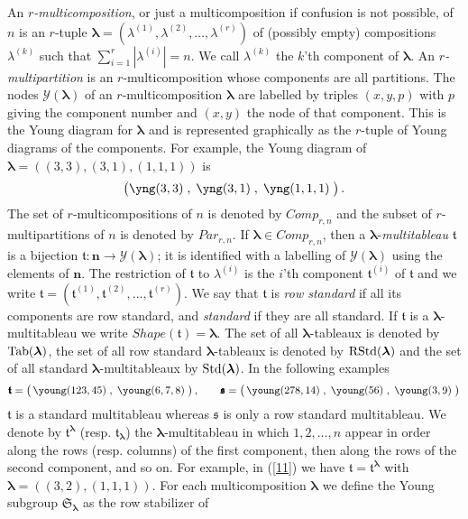\documentclass[10pt,a4,twoside,hidelinks,rm]{article}
\newcommand{\Y}{\mathcal{Y}}
\newcommand{\T}{\mathfrak{t}}
\newcommand{\bT}{\pmb{\mathfrak{t}}}
\newcommand{\Bs}{\pmb{\mathfrak{s}}}
\newcommand{\MP}{{ {Par}}_{r,n}}
\newcommand{\MC}{{ {Comp}}_{r,n}}
\newcommand{\Si}{\mathfrak{S}}
\newcommand{\std}{{\rm Std}}
\newcommand{\rstd}{{\rm RStd}}
\newcommand{\Tab}{{\rm Tab}}
\newcommand\blambda{{\boldsymbol\lambda}}
\theoremstyle{plain}
\begin{document}
An \textit{$r$-multicomposition}, or just a multicomposition if confusion is not possible, 
of $n$ is an $r$-tuple
$\blambda=(\lambda^{(1)},\lambda^{(2)},\ldots,\lambda^{(r)})$ of
(possibly empty) compositions $\lambda^{(k)}$ such that
$\sum_{i=1}^{r}|\lambda^{(i)}|=n$. We call $\lambda^{(k)}$ the
$k$'th component of $\blambda$. An \textit{$r$-multipartition} is 
an $r$-multicomposition whose
components are all partitions.
The nodes $ \Y(\blambda) $ of an $r$-multicomposition $ \blambda $ are labelled by triples
$(x,y,p)$ with $p$ giving the component number and $ (x,y) $
the node of that component.
This is the
Young diagram for $ \blambda $ and is represented
graphically as the $ r$-tuple of Young diagrams of the components. For example, the
Young diagram of $\blambda=((3,3),(3,1),(1,1,1))$ is
$$\left( \yng(3,3) \;,\; \yng(3,1) \;,\; \yng(1,1,1)\; \right).$$
The set of $r$-multicompositions of $n$ is denoted by $ \MC  $ 
and the subset of $r$-multi\-partitions of $n$ is denoted by $ \MP  $.
If $\blambda \in \MC$, then 
a $\blambda$-\textit{multitableau} $ \bT $ is a
bijection $\bT: \mathbf{n} \to \Y({\blambda})$; it is 
identified with a labelling of $ \Y(\blambda) $ using the elements of
$\mathbf{n}$. The restriction of $\bT$ to $ \lambda^{(i)} $ is 
the $i$'th component $ \T^{(i)} $ of $\bT$ and we write $
\bT=(\T^{(1)}, \T^{(2)}, \ldots, \T^{(r)}) $. We say that $\bT$ is \textit{row
standard} if all its components are row standard, and
\textit{standard} if they are all standard. If $
\bT $ is a $ \blambda$-multitableau we write $ Shape(\bT) =
\blambda$. The set of all
$\blambda$-tableaux is
denoted by $\Tab(\blambda)$, the set of all
row standard $\blambda$-tableaux is
denoted by $\rstd(\blambda)$
and the set of all 
standard $\blambda$-multitableaux 
by $\std(\blambda)$.
In the following examples
\begin{equation}\label{11}
\bT=\left(\,\young(123,45)\;,\;\young(6,7,8)\;\right), \qquad
\Bs=\left(\,\young(278,14)\;,\;\young(56)\;,\;\young(3,9)
\;\right)
\end{equation}
$\bT$ is a standard multitableau whereas $\Bs$ is only a row standard multitableau. 
We denote by $\bT^{\blambda}$ (resp. $\bT_{\blambda}$) the
$\blambda$-multitableau in which $1,2,\ldots, n$ appear in order along the rows (resp. columns) of
the first component, then along the rows of the second component,
and so on. For example, in (\ref{11}) we have $ \bT= \bT^{\blambda}$ with 
$\blambda=((3,2),(1,1,1))$.
For each multicomposition $\blambda$ we define the Young subgroup
$\Si_{\blambda}$ as the row stabilizer of
\end{document}
